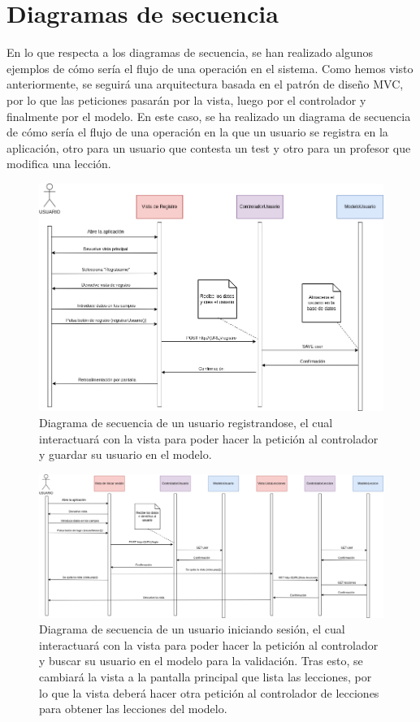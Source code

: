 \section{Diagramas de secuencia}
En lo que respecta a los diagramas de secuencia, se han realizado algunos ejemplos de cómo sería el flujo de una operación en el sistema. Como hemos visto anteriormente,
se seguirá una arquitectura basada en el patrón de diseño MVC, por lo que las peticiones pasarán por la vista, luego por el controlador y finalmente por el modelo.
En este caso, se ha realizado un diagrama de secuencia de cómo sería el flujo de una operación en la que un usuario se registra en la aplicación, otro para un usuario que contesta un test y otro
para un profesor que modifica una lección.

\begin{figure}[H]
    \centering
    \centerline{\includegraphics[width=\textwidth]{imagenes/c6/diagramadesecuencia.png}}
    \caption{Diagrama de secuencia de un usuario registrandose, el cual interactuará con la vista para poder hacer la petición al controlador y guardar su usuario en el modelo.}
    \label{fig:diagramadesecuencia}    
\end{figure}

\begin{figure}[H]
    \centering
    \centerline{\includegraphics[width=\textwidth]{imagenes/c6/diagramadesecuencia2.png}}
    \caption{Diagrama de secuencia de un usuario iniciando sesión, el cual interactuará con la vista para poder hacer la petición al controlador y buscar su usuario en el modelo para la validación. Tras esto, se cambiará la vista a la pantalla principal que lista las lecciones, por lo que la vista deberá hacer otra petición al controlador de lecciones para obtener las lecciones del modelo.}
    \label{fig:diagramadesecuencia}    
\end{figure}

